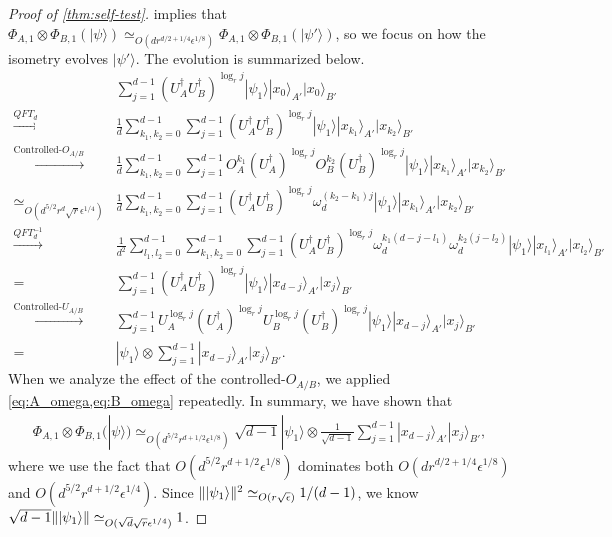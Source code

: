 \documentclass[11pt,letterpaper]{article}
\newcommand{\ket}[1]{|#1\rangle}
\newcommand{\x}{\otimes}
\newcommand{\ct}{^{\dagger}}
\DeclarePairedDelimiter{\norm}{\lVert}{\rVert}
\newcommand{\1}{\mathbb{1}}
\newcommand{\ep}{\epsilon}
\newcommand{\se}{\sqrt{\epsilon}}
\newcommand{\qe}{\epsilon^{1/4}}
\newcommand{\sd}{\sqrt{d}}
\newcommand{\sr}{\sqrt{r}}
\newcommand{\appd}[1]{\simeq_{#1}}
\theoremstyle{definition}
\begin{document}
\begin{proof}[Proof of \cref{thm:self-test}]
 implies that $ \Phi_{A,1} \x \Phi_{B,1} (\ket{\psi}) \appd{O(d r^{d/2 +1/4} \ep^{1/8})}  \Phi_{A,1} \x \Phi_{B,1} (\ket{\psi'})$,  
so we focus on how the isometry evolves $\ket{\psi'}$.
The evolution is summarized below.
	\begin{align*}
		& \sum_{j=1}^{d-1} (U_A\ct U_B\ct)^{\log_r j} \ket{\psi_1} \ket{x_0}_{A'}\ket{x_0}_{B'}\\
		\xrightarrow[]{QFT_d}& \frac{1}{d}\sum_{k_1,k_2 = 0}^{d-1} \sum_{j=1}^{d-1} (U_A\ct U_B\ct)^{\log_r j}  \ket{\psi_1}\ket{x_{k_1}}_{A'}\ket{x_{k_2}}_{B'}\\
		\xrightarrow[]{\text{Controlled-}O_{A/B}}& \frac{1}{d}\sum_{k_1,k_2 = 0}^{d-1} \sum_{j=1}^{d-1} O_A^{k_1}(U_A\ct)^{\log_r j} O_B^{k_2}(U_B\ct)^{\log_r j}
		\ket{\psi_1} \ket{x_{k_1}}_{A'}\ket{x_{k_2}}_{B'}\\
		\appd{O(d^{5/2} r^{d} \sr \qe)}&\frac{1}{d} \sum_{k_1,k_2 = 0}^{d-1} \sum_{j=1}^{d-1} (U_A\ct U_B\ct)^{\log_r j}\omega_d^{(k_2-k_1)j}\ket{\psi_1} \ket{x_{k_1}}_{A'}\ket{x_{k_2}}_{B'}\\
		\xrightarrow[]{QFT_d^{-1}} &\frac{1}{d^2}\sum_{l_1,l_2 = 0}^{d-1}\sum_{k_1,k_2 = 0}^{d-1}\sum_{j=1}^{d-1} (U_A\ct U_B\ct)^{\log_r j} 
		\omega_d^{k_1(d-j-l_1)}\omega_d^{k_2(j-l_2)}\ket{\psi_1} \ket{x_{l_1}}_{A'}\ket{x_{l_2}}_{B'}\\
		= &\sum_{j=1}^{d-1}(U_A\ct U_B\ct)^{\log_r j} \ket{\psi_1} \ket{x_{d-j}}_{A'}\ket{x_j}_{B'} \\
		\xrightarrow[]{\text{Controlled-}U_{A/B}}& \sum_{j=1}^{d-1} U_A^{\log_r j} (U_A\ct)^{\log_r j} U_B^{\log_r j} (U_B\ct)^{\log_r j} \ket{\psi_1} \ket{x_{d-j}}_{A'}\ket{x_j}_{B'}\\
		=&\ket{\psi_1} \x \sum_{j=1}^{d-1} \ket{x_{d-j}}_{A'}\ket{x_j}_{B'}.
	\end{align*}
When we analyze the effect of the controlled-$O_{A/B}$, we applied \cref{eq:A_omega,eq:B_omega} repeatedly.
In summary, we have shown that
\begin{align}
	\Phi_{A,1}\x\Phi_{B,1}(\ket{\psi}) \appd{O(d^{5/2} r^{d+1/2} \ep^{1/8})} \sqrt{d-1} \ket{\psi_1} \x \frac{1}{\sqrt{d-1}}\sum_{j=1}^{d-1} \ket{x_{d-j}}_{A'}\ket{x_j}_{B'},
\end{align}
where we use the fact that $O(d^{5/2} r^{d+1/2} \ep^{1/8})$ dominates both $O(d r^{d/2+1/4} \ep^{1/8})$ and 
$O(d^{5/2} r^{d+1/2} \qe)$.
Since $\norm{\ket{\psi_1}}^2 \appd{O(r \se)} 1/(d-1)$, we know $ \sqrt{d-1} \norm{\ket{\psi_1}} \appd{O(\sd \sr\qe)} 1$.


\end{proof}
\end{document}
